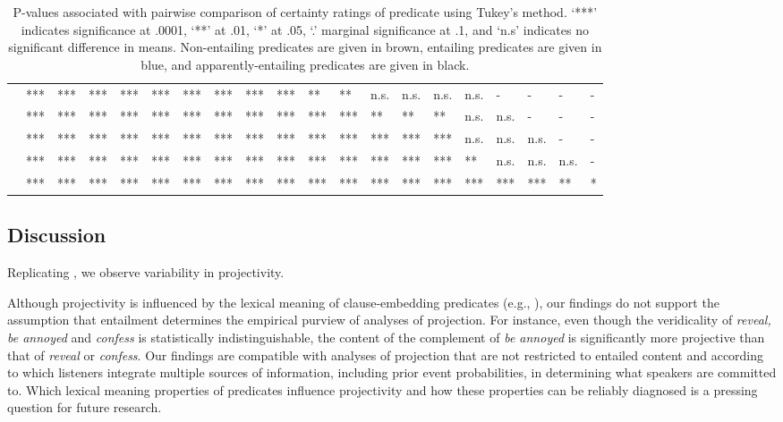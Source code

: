 \documentclass[11pt,fleqn]{article}
\newcommand{\6}{\mbox{$[\hspace*{-.6mm}[$}}
\newcommand{\9}{\mbox{$]\hspace*{-.6mm}]$}}
\begin{document}
\begin{landscape}
\begin{table}[h!]
\begin{tabular}{l l l l l l l l l l l l l l l l l l l l }
\color{brown}{\em hear}\color{black}		& *** & *** & *** & *** & *** & *** & *** & *** & *** & ** & ** & n.s. & n.s. & n.s. & n.s. & - & - & - & - \\
\color{blue}{\em see}\color{black}			& *** & *** & *** & *** & *** & *** & *** & *** & *** & *** & *** & ** & ** & ** & n.s. & n.s. & - & - & - \\
\color{black}{\em inform}\color{black}			& *** & *** & *** & *** & *** & *** & *** & *** & *** & *** & *** & *** & *** & *** & n.s. & n.s. & n.s. & - & - \\
\color{blue}{\em know}\color{black}			& *** & *** & *** & *** & *** & *** & *** & *** & *** & *** & *** & *** & *** & *** & ** & n.s. & n.s. & n.s. & -  \\
\color{blue}{\em be annoyed}\color{black}		& *** & *** & *** & *** & *** & *** & *** & *** & ***  & ***  & *** & *** & *** & *** & *** & *** & *** & ** & *  \\

\bottomrule
\end{tabular}
\caption{P-values associated with pairwise comparison of certainty ratings of predicate using Tukey's method. `***' indicates significance at .0001, `**' at .01, `*' at .05, `.' marginal significance at .1, and `n.s' indicates no significant difference in means. Non-entailing predicates are given in brown, entailing predicates are given in blue, and apparently-entailing predicates are given in black.}\label{t-pairwise-proj}
\end{table}
\end{landscape}




\subsection{Discussion}

Replicating \citealt{tbd-variability}, we observe variability in projectivity.


Although projectivity is influenced by the lexical meaning of clause-embedding predicates (e.g., \citealt{karttunen71b,tbd-variability}), our findings do not support the assumption that entailment determines the empirical purview of analyses of projection. For instance, even though the veridicality of {\em reveal, be annoyed} and {\em confess} is statistically indistinguishable, the content of the complement of {\em be annoyed} is significantly more projective than that of {\em reveal} or {\em confess}. Our findings are compatible with analyses of projection that are not restricted to entailed content and according to which listeners integrate multiple sources of information, including prior event probabilities, in determining what speakers are committed to. Which lexical meaning properties of predicates influence projectivity and how these properties can be reliably diagnosed is a pressing question for future research.
\end{document}
